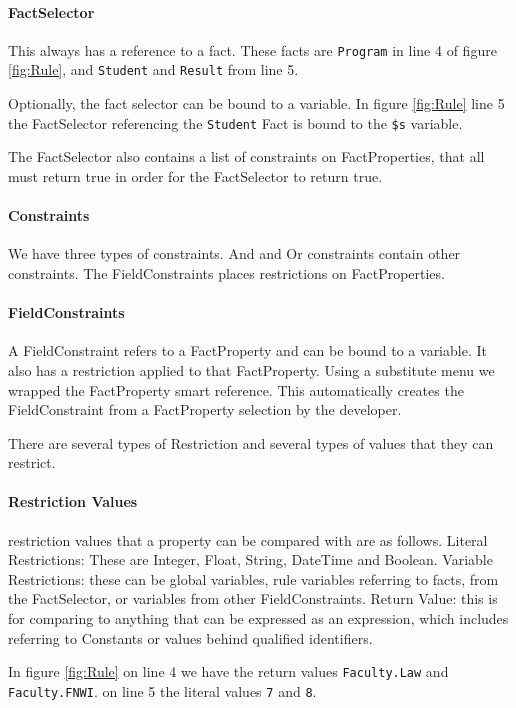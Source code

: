 \paragraph{FactSelector} This always has a reference to a fact.
These facts are \texttt{Program} in line 4 of figure \ref{fig:Rule}, and \texttt{Student} and \texttt{Result} from line 5.

Optionally, the fact selector can be bound to a variable.
In figure \ref{fig:Rule} line 5 the FactSelector referencing the \texttt{Student} Fact is bound to the \texttt{\$s} variable.

The FactSelector also contains a list of constraints on FactProperties, that all must return true in order for the FactSelector to return true.

\paragraph{Constraints} We have three types of constraints.
And and Or constraints contain other constraints.
The FieldConstraints places restrictions on FactProperties.

\paragraph{FieldConstraints}
A FieldConstraint refers to a FactProperty and can be bound to a variable.
It also has a restriction applied to that FactProperty.
Using a substitute menu we wrapped the FactProperty smart reference.
This automatically creates the FieldConstraint from a FactProperty selection by the developer.

There are several types of Restriction and several types of values that they can restrict.

\paragraph{Restriction Values} restriction values that a property can be compared with are as follows.
Literal Restrictions: These are Integer, Float, String, DateTime and Boolean.
Variable Restrictions: these can be global variables, rule variables referring to facts, from the FactSelector, or variables from other FieldConstraints.
Return Value: this is for comparing to anything that can be expressed as an expression, which includes referring to Constants or values behind qualified identifiers.

In figure \ref{fig:Rule} on line 4 we have the return values \texttt{Faculty.Law} and \texttt{Faculty.FNWI}.
on line 5 the literal values \texttt{7} and \texttt{8}.


